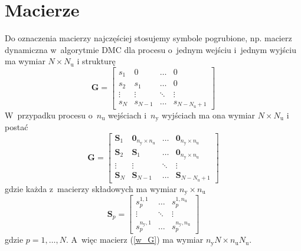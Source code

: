 \section{Macierze}
Do oznaczenia macierzy najczęściej stosujemy symbole pogrubione, np. macierz dynamiczna w~algorytmie DMC dla procesu o~jednym wejściu i~jednym wyjściu ma wymiar $N \times N_{\text{u}}$ i strukturę
\begin{equation}
\boldsymbol{G}=\left[
\begin{array}
{cccc}
s_{1} & 0 & \ldots & 0\\
s_{2} & s_{1} & \ldots & 0\\
\vdots & \vdots & \ddots & \vdots\\
s_{N} & s_{N-1} & \ldots &  s_{N-N_{\text{u}}+1}
\end{array}
\right]
\end{equation}
W~przypadku procesu o~$n_{\text{u}}$ wejściach i~$n_{\text{y}}$ wyjściach ma ona  wymiar $N\times N_{\text{u}}$ i postać
\begin{equation}
\boldsymbol{G}=\left[
\begin{array}
{cccc}
\boldsymbol{S}_{1} & \boldsymbol{0}_{n_{\text{y}}\times n_{\text{u}}} & \ldots & \boldsymbol{0}_{n_{\text{y}}\times n_{\text{u}}}\\
\boldsymbol{S}_{2} & \boldsymbol{S}_{1} & \ldots & \boldsymbol{0}_{n_{\text{y}}\times n_{\text{u}}}\\
\vdots & \vdots & \ddots & \vdots\\
\boldsymbol{S}_{N} & \boldsymbol{S}_{N-1} & \ldots &  \boldsymbol{S}_{N-N_{\text{u}}+1}%
\end{array}
\right]
\label{w_G}
\end{equation}
gdzie każda z~macierzy składowych ma wymiar $n_{\text{y}}\times n_{\text{u}}$
\begin{equation}
\boldsymbol{S}_p=\left[
\begin{array}
{ccc}
s_p^{1,1} & \ldots & s_p^{1,n_{\text{u}}}\\
\vdots & \ddots & \vdots\\
s_p^{n_{\text{y}},1} & \ldots & s_p^{n_{\text{y}},n_{\text{u}}}
\end{array}
\right]
\end{equation}
gdzie $p=1,\ldots,N$. A~więc macierz (\ref{w_G}) ma wymiar $n_{\text{y}}N\times n_{\text{u}}N_{\text{u}}$.

